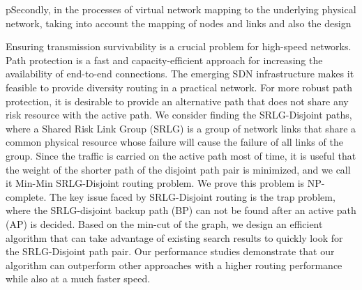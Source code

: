 {pSecondly, in the processes of virtual network mapping to the underlying physical network, taking into account the mapping of nodes and links and also the design


Ensuring transmission survivability is a crucial problem for high-speed networks. Path protection is a fast and capacity-efficient approach for increasing the availability of end-to-end connections. The emerging SDN infrastructure makes it feasible to provide diversity routing in a practical network. For more robust path protection, it is desirable to provide an alternative path that does not share any risk resource with the active path. We consider finding the SRLG-Disjoint paths, where a Shared Risk Link Group (SRLG) is a group of network links that share a common physical resource whose failure will cause the failure of all links of the group. Since the traffic is carried on the active path most of time, it is useful that the weight of the shorter path of the disjoint path pair is minimized, and we call it  Min-Min SRLG-Disjoint routing problem. We prove this problem is NP-complete. The key issue faced by SRLG-Disjoint routing is the trap problem, where the SRLG-disjoint backup path (BP) can not be found after an active path (AP) is decided. Based on the min-cut of the graph, we  design an  efficient algorithm that can  take advantage of existing search results to quickly look for the SRLG-Disjoint path pair. Our performance studies demonstrate that our algorithm can outperform other approaches with a higher routing performance while also at a much faster speed.}
\makecover
\clearpage
